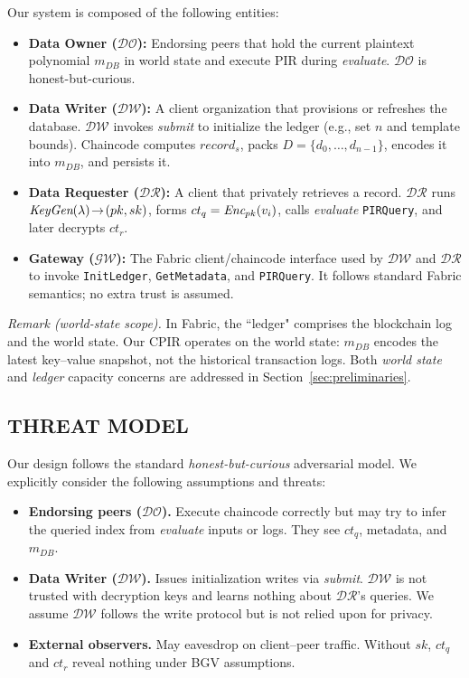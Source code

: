 \documentclass[letterpaper,journal]{IEEEtran}
\begin{document}
\noindent Our system is composed of the following entities:

\begin{itemize}
    \item \textbf{Data Owner ($\mathcal{DO}$):} Endorsing peers that hold the current plaintext 
    polynomial \emph{$m_{DB}$} in world state and execute PIR during \emph{evaluate}. $\mathcal{DO}$ is honest-but-curious.
    \item \textbf{Data Writer ($\mathcal{DW}$):} A client organization that provisions or refreshes 
    the database. $\mathcal{DW}$ invokes \emph{submit} to initialize the ledger (e.g., set $n$ and template bounds). 
    Chaincode computes $record_s$, packs $D=\{d_0,\dots,d_{n-1}\}$, encodes it into \emph{$m_{DB}$}, and persists it.
    \item \textbf{Data Requester ($\mathcal{DR}$):} A client that privately retrieves a record. $\mathcal{DR}$ 
    runs $\emph{KeyGen}(\lambda)\!\to\!(pk,sk)$, forms $ct_q=\emph{Enc}_{pk}(v_i)$, calls \emph{evaluate} \texttt{PIRQuery}, and later decrypts $ct_r$.
    \item \textbf{Gateway ($\mathcal{GW}$):} The Fabric client/chaincode interface used by $\mathcal{DW}$ 
    and $\mathcal{DR}$ to invoke \texttt{InitLedger}, \texttt{GetMetadata}, and \texttt{PIRQuery}. It follows standard Fabric semantics; no extra trust is assumed.
\end{itemize}

\noindent\textit{Remark (world-state scope).} In Fabric, the ``ledger" comprises the blockchain log and the world state. 
Our CPIR operates on the world state: \emph{$m_{DB}$} encodes the latest key--value snapshot, not the historical transaction logs.
Both \emph{world state} and \emph{ledger} capacity concerns are addressed in Section~\ref{sec:preliminaries}.

\subsection{THREAT MODEL}

Our design follows the standard \emph{honest-but-curious} adversarial model. 
We explicitly consider the following assumptions and threats:

\begin{itemize}
    \item \textbf{Endorsing peers ($\mathcal{DO}$).} Execute chaincode correctly but may try to infer the queried index 
    from \emph{evaluate} inputs or logs. They see $ct_q$, metadata, and \emph{$m_{DB}$}.
    \item \textbf{Data Writer ($\mathcal{DW}$).} Issues initialization writes via \emph{submit}. $\mathcal{DW}$ is not 
    trusted with decryption keys and learns nothing about $\mathcal{DR}$’s queries. We assume $\mathcal{DW}$ follows the 
    write protocol but is not relied upon for privacy.
    \item \textbf{External observers.} May eavesdrop on client–peer traffic. Without $sk$, $ct_q$ and $ct_r$ reveal nothing under BGV assumptions.
\end{itemize}
\end{document}

